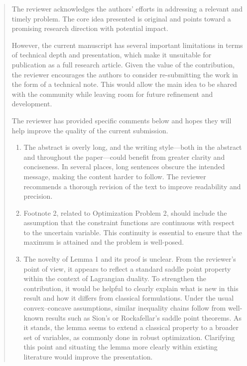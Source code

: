 \documentclass[journal,twoside,web]{ieeecolor}
\begin{document}
\begin{quote}
The reviewer acknowledges the authors' efforts in addressing a relevant and timely problem. The core idea presented is original and points toward a promising research direction with potential impact.

However, the current manuscript has several important limitations in terms of technical depth and presentation, which make it unsuitable for publication as a full research article. Given the value of the contribution, the reviewer encourages the authors to consider re-submitting the work in the form of a technical note. This would allow the main idea to be shared with the community while leaving room for future refinement and development.

The reviewer has provided specific comments below and hopes they will help improve the quality of the current submission.

\begin{enumerate}
\item The abstract is overly long, and the writing style—both in the abstract and throughout the paper—could benefit from greater clarity and conciseness. In several places, long sentences obscure the intended message, making the content harder to follow. The reviewer recommends a thorough revision of the text to improve readability and precision.

\item Footnote 2, related to Optimization Problem 2, should include the assumption that the constraint functions are continuous with respect to the uncertain variable. This continuity is essential to ensure that the maximum is attained and the problem is well-posed.

\item The novelty of Lemma 1 and its proof is unclear. From the reviewer's point of view, it appears to reflect a standard saddle point property within the context of Lagrangian duality. To strengthen the contribution, it would be helpful to clearly explain what is new in this result and how it differs from classical formulations. Under the usual convex–concave assumptions, similar inequality chains follow from well-known results such as Sion's or Rockafellar's saddle point theorems. As it stands, the lemma seems to extend a classical property to a broader set of variables, as commonly done in robust optimization. Clarifying this point and situating the lemma more clearly within existing literature would improve the presentation.


\end{enumerate}
\end{quote}
\end{document}
